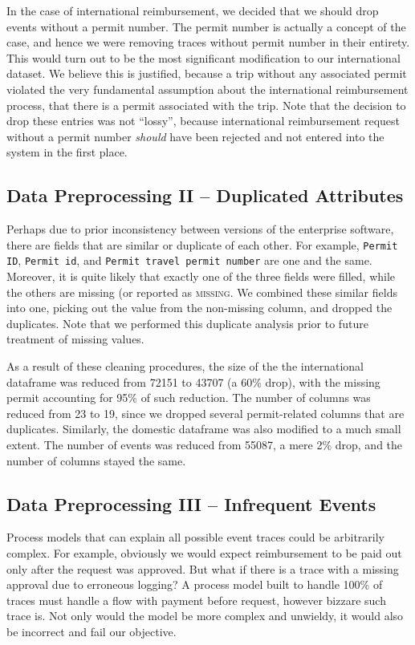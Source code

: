 \documentclass[conference]{IEEEtran}
\begin{document}
In the case of international reimbursement, we decided that we should
drop events without a permit number. The permit number is actually a
concept of the case, and hence we were removing traces without permit
number in their entirety. This would turn out to be the most significant
modification to our international dataset.
We believe this is justified, because a trip
without any associated permit violated the very fundamental assumption
about the international reimbursement process, that there is a permit
associated with the trip. Note that the decision to drop these entries was
not ``lossy'', because international reimbursement request without a permit
number \textit{should} have been rejected and not entered into the system
in the first place.

\subsection{Data Preprocessing II -- Duplicated Attributes}

Perhaps due to prior inconsistency between
versions of the enterprise software, there are fields that are similar
or duplicate of each other. For example, \texttt{Permit ID}, \texttt{Permit id},
and \texttt{Permit travel permit number} are one and the same.
Moreover, it is quite likely that exactly one of the three fields were
filled, while the others are missing (or reported as
\textsc{missing}. We combined these similar fields into one, picking out
the value from the non-missing column, and dropped the duplicates. Note that 
we performed this duplicate analysis prior to future treatment of missing
values.

As a result of these cleaning procedures, the size of the
the international dataframe was reduced from 72151 to 43707 (a 60\% drop),
with the
missing permit accounting for 95\% of such reduction. The number of
columns was reduced from 23 to 19, since we dropped
several permit-related columns that are duplicates.
Similarly, the domestic dataframe was also modified to a much small extent.
The number of events was reduced from 55087, a mere 2\% drop, and the
number of columns stayed the same.

\subsection{Data Preprocessing III -- Infrequent Events}

Process models that can explain all possible event traces could be
arbitrarily complex. For example, obviously we would expect reimbursement to
be paid out only after the request was approved. But what if there is
a trace with a missing approval due to erroneous logging? A process model
built to handle 100\% of traces must handle a flow with
payment before request, however bizzare such trace is.
Not only would the model be more complex and unwieldy,
it would also be incorrect and fail our objective.
\end{document}
